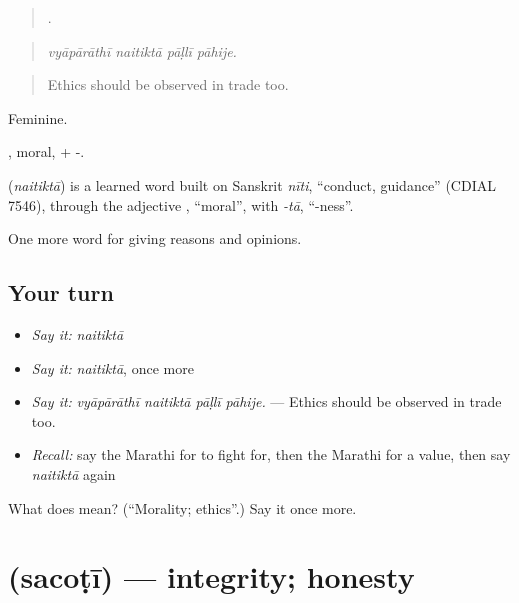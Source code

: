 \begin{quote}
   .
\end{quote}

\begin{quote}
\emph{vyāpārāthī naitiktā pāḷlī pāhije.}
\end{quote}

\begin{quote}
Ethics should be observed in trade too.
\end{quote}

Feminine.

, moral, + -.

\begin{cousinweb}
\textbf{} (\emph{naitiktā}) is a learned word built on Sanskrit \emph{nīti}, \textquotedblleft{}conduct, guidance\textquotedblright{} (CDIAL 7546), through the adjective , \textquotedblleft{}moral\textquotedblright{}, with \emph{-tā}, \textquotedblleft{}-ness\textquotedblright{}.
\end{cousinweb}

\begin{grammarlens}[title={What you've built}]
One more word for giving reasons and opinions.
\end{grammarlens}

\subsection*{Your turn}
\begin{itemize}
\raggedright
  \item \emph{Say it:} \emph{naitiktā}
  \item \emph{Say it:} \emph{naitiktā}, once more
  \item \emph{Say it:} \emph{vyāpārāthī naitiktā pāḷlī pāhije.} — Ethics should be observed in trade too.
  \item \emph{Recall:} say the Marathi for to fight for, then the Marathi for a value, then say \emph{naitiktā} again
\end{itemize}

\begin{tcolorbox}[breakable,colback=teal!4,colframe=teal!35!black,title={Before you move on}]
What does  mean? (\textquotedblleft{}Morality; ethics\textquotedblright{}.) Say it once more.
\end{tcolorbox}
\section[\texorpdfstring{\mr{सचोटी} (sacoṭī)}{सचोटी (sacoṭī)}]{ (sacoṭī) — integrity; honesty}

